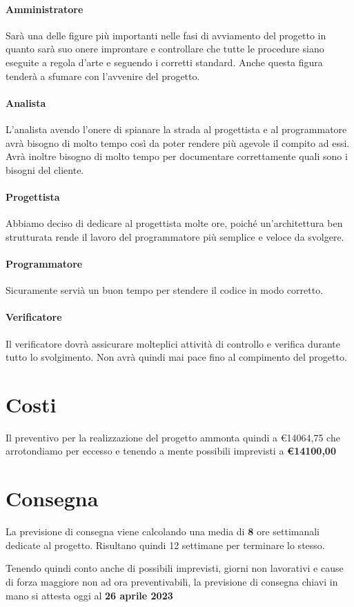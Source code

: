 \paragraph{Amministratore} Sarà una delle figure più importanti nelle fasi di avviamento del progetto in quanto sarà suo onere improntare e controllare che tutte le procedure siano eseguite a regola d'arte e seguendo i corretti standard. Anche questa figura tenderà a sfumare con l'avvenire del progetto.

\paragraph{Analista}L'analista avendo l'onere di spianare la strada al progettista e al programmatore avrà bisogno di molto tempo così da poter rendere più agevole il compito ad essi. Avrà inoltre bisogno di molto tempo per documentare correttamente quali sono i bisogni del cliente.

\paragraph{Progettista} Abbiamo deciso di dedicare al progettista molte ore, poiché un'architettura ben strutturata rende il lavoro del programmatore più semplice e veloce da svolgere.

\paragraph{Programmatore} Sicuramente servià un buon tempo per stendere il codice in modo corretto.

\paragraph{Verificatore} Il verificatore dovrà assicurare molteplici attività di controllo e verifica durante tutto lo svolgimento. Non avrà quindi mai pace fino al compimento del progetto.

\section{Costi}

Il preventivo per la realizzazione del progetto ammonta quindi a €14064,75 che arrotondiamo per eccesso e tenendo a mente possibili imprevisti a \textbf{€14100,00}

\section{Consegna}

La previsione di consegna viene calcolando una media di \textbf{8} ore settimanali dedicate al progetto. Risultano quindi 12 settimane per terminare lo stesso.

Tenendo quindi conto anche di possibili imprevisti, giorni non lavorativi e cause di forza maggiore non ad ora preventivabili, la previsione di consegna chiavi in mano si attesta oggi al \textbf{26 aprile 2023}
